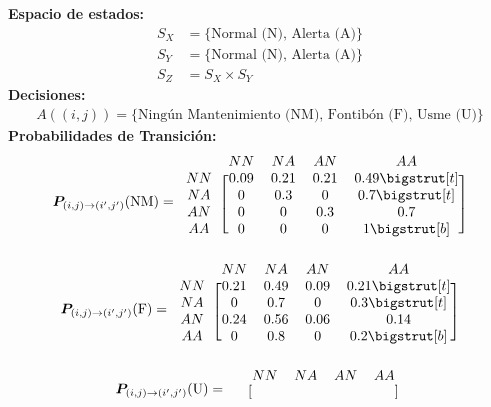 \begin{enumerate}[label=\alph*.]
\noindent \textbf{Espacio de estados:}
    \begin{align*}
      S_{X}&=\{\text{Normal (N), Alerta (A)} \} \\
      S_{Y}&=\{\text{Normal (N), Alerta (A)}\} \\
      S_{Z}&= S_{X} \times S_{Y}
    \end{align*}
\textbf{Decisiones:}
    \begin{align*}
      A((i,j))=\{\text{Ningún Mantenimiento (NM), Fontibón (F), Usme (U)}\}
    \end{align*}
\textbf{Probabilidades de Transición:}
    \begin{equation*}
        \bm{P}_{(i,j) \to (i',j')}(\text{NM}) =
        \begin{blockarray}{cccccc}
          & NN & NA & AN & AA \\
        \begin{block}{c[ccccc]}
        NN & 0.09& 0.21& 0.21&0.49\bigstrut[t] \\
        NA & 0&0.3&0&0.7\bigstrut[t] \\
        AN & 0& 0& 0.3& 0.7\\
        AA & 0&0& 0&1\bigstrut[b]\\
        \end{block}
        \end{blockarray}\vspace*{-1.25\baselineskip}
    \end{equation*}
\begin{equation*}
\bm{P}_{(i,j) \to (i',j')}(\text{F}) =
\begin{blockarray}{cccccc}
  & NN & NA & AN & AA \\
\begin{block}{c[ccccc]}
NN & 0.21& 0.49& 0.09&0.21\bigstrut[t] \\
NA & 0&0.7&0&0.3\bigstrut[t] \\
AN & 0.24& 0.56& 0.06& 0.14\\
AA & 0&0.8& 0&0.2\bigstrut[b]\\
\end{block}
\end{blockarray}\vspace*{-1.25\baselineskip}
\end{equation*}
\begin{equation*}
\bm{P}_{(i,j) \to (i',j')}(\text{U}) =
\begin{blockarray}{cccccc}
  & NN & NA & AN & AA \\
\begin{block}{c[ccccc]}

\end{block}
\end{blockarray}
\end{equation*}
\end{enumerate}
